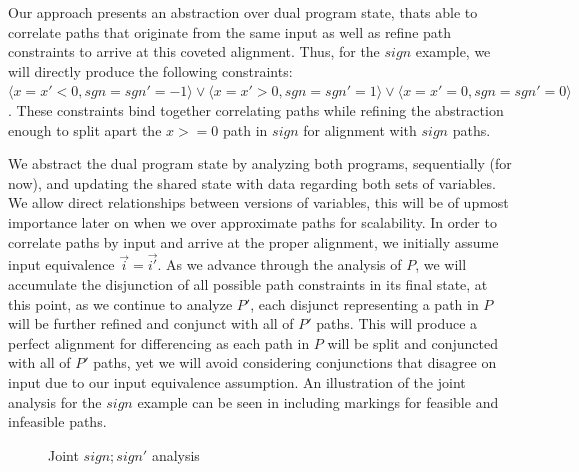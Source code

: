 Our approach presents an abstraction over dual program state, thats able to correlate paths that originate from the same input as well as refine path constraints to arrive at this coveted alignment. Thus, for the $sign$ example, we will directly produce the following constraints: $\langle x = x' < 0, sgn = sgn' = -1 \rangle \vee \langle x = x' > 0, sgn = sgn' = 1 \rangle \vee \langle x = x' = 0, sgn = sgn' = 0 \rangle$. These constraints bind together correlating paths while refining the abstraction enough to split apart the $x>=0$ path in $sign$ for alignment with $sign$ paths.

We abstract the dual program state by analyzing both programs, sequentially (for now), and updating the shared state with data regarding both sets of variables. We allow direct relationships between versions of variables, this will be of upmost importance later on when we over approximate paths for scalability. In order to correlate paths by input and arrive at the proper alignment, we initially assume input equivalence $\vec{i} = \vec{i'}$. As we advance through the analysis of $P$, we will accumulate the disjunction of all possible path constraints in its final state, at this point, as we continue to analyze $P'$, each disjunct representing a path in $P$ will be further refined and conjunct with all of $P'$ paths. This will produce a perfect alignment for differencing as each path in $P$ will be split and conjuncted with all of $P'$ paths, yet we will avoid considering conjunctions that disagree on input due to our  input equivalence assumption. An illustration of the joint analysis for the $sign$ example can be seen in  including markings for feasible and infeasible paths.

\begin{figure}
\caption{Joint $sign;sign'$ analysis}
\end{figure}

